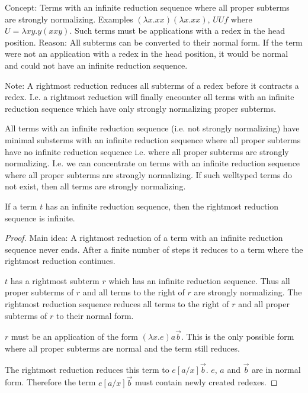 Concept: Terms with an infinite reduction sequence where all proper subterms are
strongly normalizing. Examples $(\lambda x. x x)(\lambda x. x x)$, $U U f$ where
$U = \lambda x y. y (x x y)$. Such terms must be applications with a redex in
the head position. Reason: All subterms can be converted to their normal form.
If the term were not an application with  a redex in the head position, it would
be normal and could not have an infinite reduction sequence.

Note: A rightmost reduction reduces all subterms of a redex before it contracts
a redex. I.e. a rightmost reduction will finally encounter all terms with an
infinite reduction sequence which have only strongly normalizing proper
subterms.

All terms with an infinite reduction sequence (i.e. not strongly normalizing)
have minimal substerms with an infinite reduction sequence where all proper
subterms have no infinite reduction sequence i.e. where all proper subterms are
strongly normalizing. I.e. we can concentrate on terms with an infinite
reduction sequence where all proper subterms are strongly normalizing. If such
welltyped terms do not exist, then all terms are strongly normalizing.


\begin{theorem} If a term $t$ has an infinite reduction sequence, then the
    rightmost reduction sequence is infinite.

    \begin{proof}
        Main idea: A rightmost reduction of a term with an infinite reduction
        sequence never ends. After a finite number of steps it reduces to a term
        where the rightmost reduction continues.

        $t$ has  a rightmost subterm $r$ which has an infinite reduction
        sequence. Thus all proper subterms of $r$ and all terms to the right of
        $r$ are strongly normalizing. The rightmost reduction sequence reduces
        all terms to the right of $r$ and all proper subterms of $r$ to their
        normal form.

        $r$ must be an application of the form $(\lambda x. e) a \vec b$. This
        is the only possible form where all proper subterms are normal and the
        term still reduces.

        The rightmost reduction reduces this term to $e[a/x] \vec b$. $e$, $a$
        and $\vec b$ are in normal form. Therefore the term $e[a/x] \vec b$ must
        contain newly created redexes.
    \end{proof}
\end{theorem}







